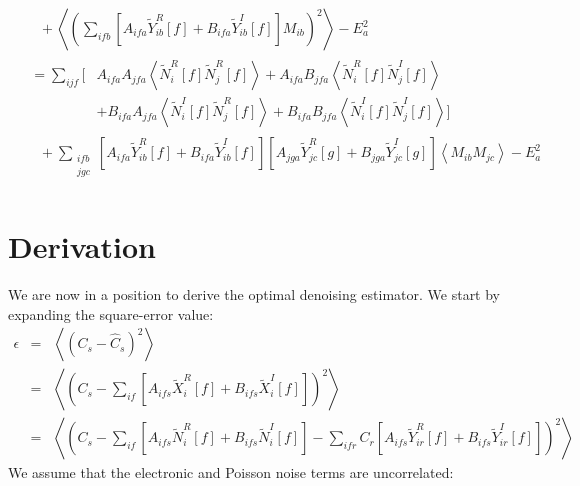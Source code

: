 \begin{align*}
&\quad + \left<\left(\sum_{ifb} \left[ A_{ifa} \widetilde{Y}_{ib}^R[f] + B_{ifa} \widetilde{Y}_{ib}^I[f]\right]M_{ib} \right)^2 \right> - E^2_a \\
%
& \begin{aligned}
  = \sum_{ijf} \bigg[ & A_{ifa}A_{jfa} \left<\widetilde{N}_i^R[f]\widetilde{N}_j^R[f]\right> + A_{ifa}B_{jfa} \left<\widetilde{N}_i^R[f]\widetilde{N}_j^I[f]\right> \\
  & + B_{ifa}A_{jfa} \left<\widetilde{N}_i^I[f]\widetilde{N}_j^R[f]\right> + B_{ifa}B_{jfa} \left<\widetilde{N}_i^I[f]\widetilde{N}_j^I[f]\right>\bigg] \end{aligned} \\
&\quad + \sum_{\substack{ifb\\jgc}} \left[A_{ifa} \widetilde{Y}_{ib}^R[f] + B_{ifa} \widetilde{Y}_{ib}^I[f]\right]\left[A_{jga} \widetilde{Y}_{jc}^R[g] + B_{jga} \widetilde{Y}_{jc}^I[g]\right] \left<M_{ib}M_{jc}\right> - E^2_a \\
\end{align*}







\section{Derivation}

We are now in a position to derive the optimal denoising estimator.  We start by expanding the square-error value:
\[
\begin{array}{rcl}
\epsilon &=& \left< \left(C_s - \widehat{C}_s\right)^2\right> \\

&=& \left<\left(C_s - \sum_{if} \left[A_{ifs} \widetilde{X}_i^R[f] + B_{ifs} \widetilde{X}_i^I[f]\right]\right)^2\right> \\

&=& \left<\left(C_s - \sum_{if} \left[A_{ifs}\widetilde{N}_i^R[f] + B_{ifs}\widetilde{N}_i^I[f]\right]
                    - \sum_{ifr}C_r\left[A_{ifs}\widetilde{Y}_{ir}^R[f] + B_{ifs}\widetilde{Y}_{ir}^I[f]\right]
    \right)^2\right>
\end{array}
\]
We assume that the electronic and Poisson noise terms are uncorrelated:
%



